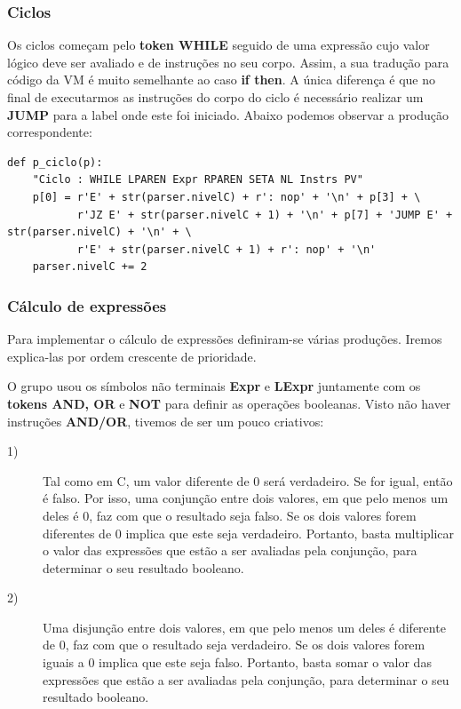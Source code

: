 \documentclass{article}
\begin{document}

\subsubsection {Ciclos}
\setlength{\parindent}{5ex}Os ciclos começam pelo  \textbf{token WHILE} seguido de uma expressão cujo valor lógico deve ser avaliado e de instruções no seu corpo. Assim, a sua tradução para código da VM é muito semelhante ao caso \textbf{if then}. A única diferença é que no final de executarmos as instruções do corpo do ciclo é necessário realizar um \textbf{JUMP} para a label onde este foi iniciado. Abaixo podemos observar a produção correspondente:

\begin{lstlisting}[firstnumber=321]
def p_ciclo(p):
    "Ciclo : WHILE LPAREN Expr RPAREN SETA NL Instrs PV"
    p[0] = r'E' + str(parser.nivelC) + r': nop' + '\n' + p[3] + \
           r'JZ E' + str(parser.nivelC + 1) + '\n' + p[7] + 'JUMP E' + str(parser.nivelC) + '\n' + \
           r'E' + str(parser.nivelC + 1) + r': nop' + '\n'
    parser.nivelC += 2
\end{lstlisting}


\subsubsection {Cálculo de expressões}
\setlength{\parindent}{5ex} Para implementar o cálculo de expressões definiram-se várias produções. Iremos explica-las por ordem crescente de prioridade. 
\par O grupo usou os símbolos não terminais \textbf{Expr} e \textbf{LExpr} juntamente com os \textbf{tokens AND, OR} e \textbf{NOT} para definir as operações booleanas. Visto não haver instruções \textbf{AND/OR}, tivemos de ser um pouco criativos:

\begin{description}
\item[1)] Tal como em C, um valor diferente de 0 será verdadeiro. Se for igual, então é falso. Por isso, uma conjunção entre dois valores, em que pelo menos um deles é 0, faz com que o resultado seja falso. Se os dois valores forem diferentes de 0 implica que este seja verdadeiro. Portanto, basta multiplicar o valor das expressões que estão a ser avaliadas pela conjunção, para determinar o seu resultado booleano.

\item[2)] Uma disjunção entre dois valores, em que pelo menos um deles é diferente de 0, faz com que o resultado seja verdadeiro. Se os dois valores forem iguais a 0 implica que este seja falso. Portanto, basta somar o valor das expressões que estão a ser avaliadas pela conjunção, para determinar o seu resultado booleano.
\end{description}
\end{document}
